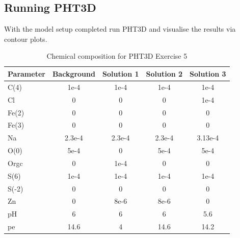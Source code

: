 \subsection[Running PHT3D]{Running PHT3D}

With the model setup completed run PHT3D and visualise the results via contour plots.


\begin{table}[hb]
\caption{Chemical composition for PHT3D Exercise 5}
\begin{center}
\begin{tabular}{lcccc} 
\toprule
Parameter  & Background & Solution 1 & Solution 2 & Solution 3\\
\midrule
C(4)      &   1e-4 &   1e-4  &   1e-4 &   1e-4\\
Cl      &   0 &   0  &  0  &   1e-4 \\
Fe(2)      &   0 &   0  &  0  &   0 \\
Fe(3)      &   0 &   0  &  0  &   0 \\
Na      &   2.3e-4 &   2.3e-4 &   2.3e-4 &   3.13e-4 \\
O(0)      &   5e-4 &   0 &   5e-4 &   5e-4\\
Orgc      &   0 &   1e-4 &   0  &  0 \\
S(6)      &   1e-4 &   1e-4  &   1e-4 &   1e-4\\
S(-2)      &   0 &   0  &  0  &   0 \\
Zn      &   0 &   8e-6  &  8e-6  &   0 \\
pH      &   6 &   6 &  6  &   5.6 \\
pe      &   14.6 &   4 &  14.6  &   14.2 \\
\bottomrule

\end{tabular}
\label{scm_solution_table}
\end{center}
\end{table}


